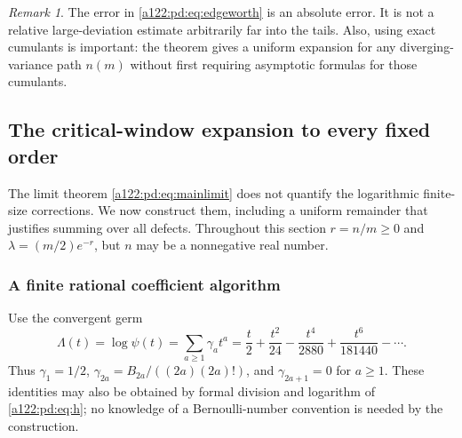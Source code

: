 \documentclass[11pt,letterpaper]{article}
\numberwithin{equation}{subsection}
\theoremstyle{definition}
\theoremstyle{remark}
\newtheorem{remark}[theorem]{Remark}
\theoremstyle{plain}
\begin{document}
\begin{remark}
The error in \eqref{a122:pd:eq:edgeworth} is an absolute error. It is not a
relative large-deviation estimate arbitrarily far into the tails.
Also, using exact cumulants is important: the theorem gives a uniform
expansion for any diverging-variance path $n(m)$ without first requiring
asymptotic formulas for those cumulants.
\end{remark}

\subsection{The critical-window expansion to every fixed order}
\label{a122:pd:sec:allorders}
The limit theorem \eqref{a122:pd:eq:mainlimit} does not quantify the logarithmic
finite-size corrections. We now construct them, including a uniform
remainder that justifies summing over all defects.
Throughout this section $r=n/m\ge0$ and
$\lambda=(m/2)e^{-r}$, but $n$ may be a nonnegative real number.

\subsubsection{A finite rational coefficient algorithm}
Use the convergent germ
\begin{equation}\label{a122:pd:eq:logh}
 \Lambda(t)=\log\psi(t)=\sum_{a\ge1}\gamma_a t^a
 =\frac t2+\frac{t^2}{24}-\frac{t^4}{2880}
  +\frac{t^6}{181440}-\cdots.
\end{equation}
Thus $\gamma_1=1/2$, $\gamma_{2a}=B_{2a}/((2a)(2a)!)$, and
$\gamma_{2a+1}=0$ for $a\ge1$. These identities may also be obtained
by formal division and logarithm of \eqref{a122:pd:eq:h}; no knowledge of a
Bernoulli-number convention is needed by the construction.
\end{document}
